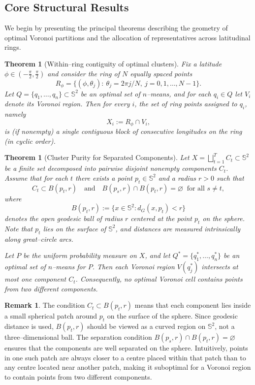 \documentclass[12pt, reqno]{amsart}
\theoremstyle{plain}
\newtheorem{theorem}[subsection]{Theorem}
\theoremstyle{definition}
\newtheorem{remark}[subsection]{Remark}
\newcommand{\D}[1]{\mathbb{#1}}%
\begin{document}
\subsection*{Core Structural Results}

We begin by presenting the principal theorems describing the geometry of optimal Voronoi partitions and the allocation of representatives across latitudinal rings.

\begin{theorem}[Within--ring contiguity of optimal clusters]\label{thm:within-ring-contiguity-simple-index}
Fix a latitude $\phi\in(-\frac{\pi}{2},\frac{\pi}{2})$ and consider the ring of $N$ equally spaced points
\[
R_\phi=\{(\phi,\theta_j):\ \theta_j = 2\pi j/N,\ j=0,1,\ldots,N-1\}.
\]
Let $Q=\{q_1,\dots,q_n\}\subset \D S^2$ be an optimal set of $n$--means, and for each $q_i\in Q$ let $V_i$ denote its Voronoi region. Then for every $i$, the set of ring points assigned to $q_i$, namely
\[
X_i := R_\phi \cap V_i,
\]
is (if nonempty) a single contiguous block of consecutive longitudes on the ring (in cyclic order).
\end{theorem}


\begin{theorem}[Cluster Purity for Separated Components]\label{thm:component-purity}
Let $X=\bigsqcup_{t=1}^{T} C_t \subset \mathbb{S}^2$ be a finite set decomposed into pairwise disjoint nonempty components $C_t$. 
Assume that for each $t$ there exists a point $p_t \in \mathbb{S}^2$ and a radius $r>0$ such that
\begin{equation}\label{eq:ball-separation}
C_t \subset B(p_t,r)
\quad \text{and} \quad
B(p_s,r) \cap B(p_t,r) = \varnothing \ \text{ for all } s \neq t,
\end{equation}
where
\[
B(p_t,r) := \{x \in \mathbb{S}^2 : d_G(x,p_t) < r\}
\]
denotes the open geodesic ball of radius $r$ centered at the point $p_t$ on the sphere. 
\emph{Note that $p_t$ lies on the surface of $\mathbb{S}^2$, and distances are measured intrinsically along great–circle arcs.}

Let $P$ be the uniform probability measure on $X$, and let $Q^*=\{q_1^*,\dots,q_n^*\}$ be an optimal set of $n$–means for $P$. Then each Voronoi region $V(q_j^*)$ intersects at most one component $C_t$. Consequently, no optimal Voronoi cell contains points from two different components.
\end{theorem}

\begin{remark}
The condition $C_t \subset B(p_t,r)$ means that each component lies inside a small spherical patch around $p_t$ on the surface of the sphere. Since geodesic distance is used, $B(p_t,r)$ should be viewed as a curved region on $\mathbb{S}^2$, not a three–dimensional ball. The separation condition $B(p_s,r)\cap B(p_t,r)=\varnothing$ ensures that the components are well separated on the sphere. Intuitively, points in one such patch are always closer to a centre placed within that patch than to any centre located near another patch, making it suboptimal for a Voronoi region to contain points from two different components.
\end{remark}
\end{document}
